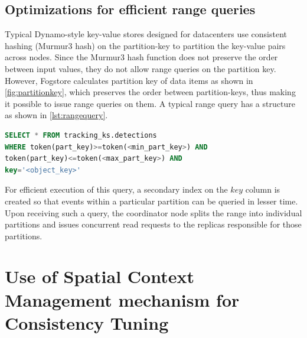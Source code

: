 \subsection{Optimizations for efficient range queries}
Typical Dynamo-style key-value stores designed for datacenters use consistent hashing (Murmur3 hash) on the partition-key to partition the key-value pairs across nodes. Since the Murmur3 hash function does not preserve the order between input values, they do not allow range queries on the partition key. However, Fogstore calculates partition key of data items as shown in \cref{fig:partitionkey}, which preserves the order between partition-keys, thus making it possible to issue range queries on them. A typical range query has a structure as shown in \cref{lst:rangequery}.
\begin{lstlisting}[caption={Typical form of a range query that Fogstore handles. The minimum and maximum limits of partition key range queried for is calculated based on the bounding-box of locations that forms the range query. Note that we omit timestamp based filtering for simplicity, however that can be incorporated in the query provided a secondary index is built on the timestamp field.},captionpos=b,label={lst:rangequery},language=SQL]
SELECT * FROM tracking_ks.detections 
WHERE token(part_key)>=token(<min_part_key>) AND 
token(part_key)<=token(<max_part_key>) AND 
key='<object_key>' 
\end{lstlisting}
\par For efficient execution of this query, a secondary index on the $key$ column is created so that events within a particular partition can be queried in lesser time. Upon receiving such a query, the coordinator node splits the range into individual partitions and issues concurrent read requests to the replicas responsible for those partitions. 

\section{Use of Spatial Context Management mechanism for Consistency Tuning}
\label{sec:consistency_tuning}

